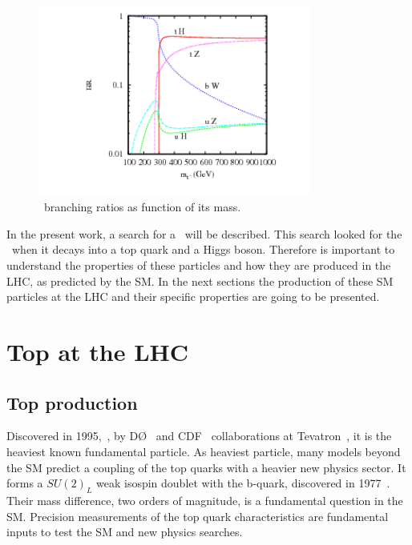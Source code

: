 \begin{figure}[!Hhtbp]
  \begin{center}
    \includegraphics[width=0.8\textwidth]{figs/pheno_br_tp.png}
    \caption{\Tp~branching ratios as function of its mass.}
    \label{fig:TBRs}
  \end{center}
\end{figure}

In the present work, a search for a \Tp~will be described. This search looked for the \Tp~when it decays into a top quark and a Higgs boson. Therefore is important to understand the properties of these particles and how they are produced in the LHC, as predicted by the SM. In the next sections the production of these SM particles at the LHC and their specific properties are going to be presented. %

\section{Top at the LHC}
\subsection{Top production}

Discovered in 1995,~\cite{Abe:1995hr, Abachi:1995iq}, by D\O~\cite{Abazov:2002su} and CDF~\cite{Blair:1996kx} collaborations at Tevatron~\cite{Group:1984bk}, it is the heaviest known fundamental particle. As heaviest particle, many models beyond the SM predict a coupling of the top quarks with a heavier new physics sector. It forms a $SU(2)_{L}$ weak isospin doublet with the b-quark, discovered in 1977~\cite{Herb:1977ek}. Their mass difference, two orders of magnitude, is a fundamental question in the SM. Precision measurements of the top quark characteristics are fundamental inputs to test the SM and new physics searches.

